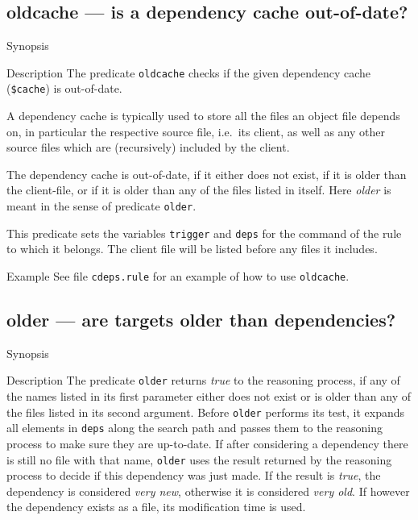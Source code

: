 \documentclass[11pt,bibtotoc,idxtotoc]{scrreprt}
\begin{document}
\subsection{oldcache --- is a dependency cache out-of-date?}
\label{pred:oldcache}
\begin{Describe}
\item[Synopsis]  
\item[Description] The predicate \texttt{oldcache} checks if the given
  dependency cache (\texttt{\$cache}) is out-of-date. 
  
  A dependency cache is typically used to store all the files an
  object file depends on, in particular the respective source file,
  i.e.\ its client, as well as any other source files which are
  (recursively) included by the client.
  
  The dependency cache is out-of-date, if it either does not exist, if
  it is older than the client-file, or if it is older than any of the
  files listed in itself. Here \textit{older} is meant in the sense of 
  predicate \texttt{older}. 

  This predicate sets the variables \texttt{trigger} and
  \texttt{deps} for the command of the rule to which it belongs. The
  client file will be listed before any files it includes.
\item[Example] See file \texttt{cdeps.rule} for an example of how to use 
  \texttt{oldcache}.
\end{Describe}
\subsection{older --- are targets older than dependencies?}
\label{pred:older}
\begin{Describe}
\item[Synopsis]  
\item[Description] The predicate \texttt{older} returns \textit{true}
  to the reasoning process, if any of the names listed in its first
  parameter either does not exist or is older than any of the files
  listed in its second argument. Before \texttt{older} performs its
  test, it expands all elements in \texttt{deps} along the search path
  and passes them to the reasoning process to make sure they are
  up-to-date. If after considering a dependency there is still no file
  with that name, \texttt{older} uses the result returned by the
  reasoning process to decide if this dependency was just made. If the
  result is \textit{true}, the dependency is considered \textit{very
    new}, otherwise it is considered \textit{very old}. If however the
  dependency exists as a file, its modification time is used.
\end{Describe}
\end{document}
